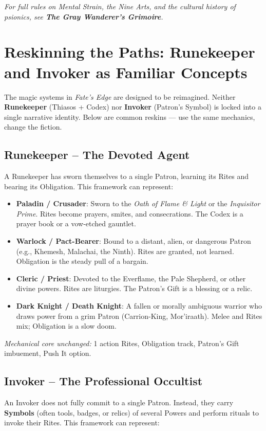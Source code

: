 \noindent \textit{For full rules on Mental Strain, the Nine Arts, and the cultural history of psionics, see \textbf{The Gray Wanderer's Grimoire}.}

\section{Reskinning the Paths: Runekeeper and Invoker as Familiar Concepts}
\label{sec:reskinning-paths}

The magic systems in \textit{Fate's Edge} are designed to be reimagined. Neither \textbf{Runekeeper} (Thiasos + Codex) nor \textbf{Invoker} (Patron's Symbol) is locked into a single narrative identity. Below are common reskins --- use the same mechanics, change the fiction.

\subsection*{Runekeeper -- The Devoted Agent}
A Runekeeper has sworn themselves to a single Patron, learning its Rites and bearing its Obligation. This framework can represent:

\begin{itemize}
  \item \textbf{Paladin / Crusader}: Sworn to the \textit{Oath of Flame \& Light} or the \textit{Inquisitor Prime}. Rites become prayers, smites, and consecrations. The Codex is a prayer book or a vow-etched gauntlet.
  \item \textbf{Warlock / Pact-Bearer}: Bound to a distant, alien, or dangerous Patron (e.g., Khemesh, Malachai, the Ninth). Rites are granted, not learned. Obligation is the steady pull of a bargain.
  \item \textbf{Cleric / Priest}: Devoted to the Everflame, the Pale Shepherd, or other divine powers. Rites are liturgies. The Patron's Gift is a blessing or a relic.
  \item \textbf{Dark Knight / Death Knight}: A fallen or morally ambiguous warrior who draws power from a grim Patron (Carrion-King, Mor'iraath). Melee and Rites mix; Obligation is a slow doom.
\end{itemize}

\noindent \textit{Mechanical core unchanged:} 1 action Rites, Obligation track, Patron's Gift imbuement, Push It option.

\subsection*{Invoker -- The Professional Occultist}
An Invoker does not fully commit to a single Patron. Instead, they carry \textbf{Symbols} (often tools, badges, or relics) of several Powers and perform rituals to invoke their Rites. This framework can represent:

